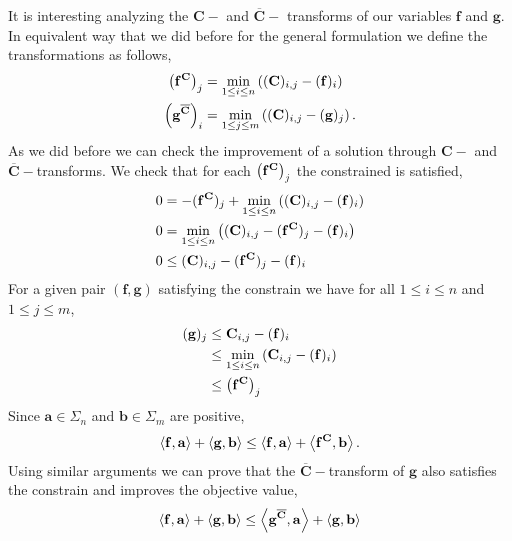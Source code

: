 It is interesting analyzing the $\mathbf{C}-$ and $\overline{\mathbf{C}}-$ transforms of our variables $\mathbf{f}$ and $\mathbf{g}$. In equivalent way that we did before for the general formulation we define the transformations as follows,
\begin{align}
	\left( \mathbf{f}^{\mathbf{C}} \right)_{j}&=\min_{1\leq i\leq n}\left( (\mathbf{C})_{i,j}-(\mathbf{f})_i \right)\\
	\left( \mathbf{g}^{\overline{\mathbf{C}}} \right)_{i}&=\min_{1\leq j\leq m}\left( (\mathbf{C})_{i,j}-(\mathbf{g})_j \right).
\end{align}
As we did before we can check the improvement of a solution through $\mathbf{C}-$ and $\overline{\mathbf{C}}-$transforms. We check that for each $\left( \mathbf{f}^{\mathbf{C}} \right)_{j}$ the constrained is satisfied,
\begin{align*}
	0&=-(\mathbf{f^{\mathbf{C}}})_j+\min_{1\leq i\leq n}\left( (\mathbf{C})_{i,j}-(\mathbf{f})_i \right)\\
	0&=\min_{1\leq i\leq n}\left( (\mathbf{C})_{i,j}-(\mathbf{f^{\mathbf{C}}})_j-(\mathbf{f})_i \right)\\
	0&\leq (\mathbf{C})_{i,j}-(\mathbf{f^{\mathbf{C}}})_j-(\mathbf{f})_i
\end{align*} 
For a given pair $(\mathbf{f,g})$ satisfying the constrain we have for all $1\leq i\leq n$ and $1\leq j\leq m$,
\begin{align*}
	(\mathbf{g})_j&\leq \mathbf{C}_{i,j}-(\mathbf{f})_i\\
	&\leq \min_{1\leq i\leq n}\left( \mathbf{C}_{i,j}-(\mathbf{f})_i \right) \\&\leq \left( \mathbf{f^\mathbf{C}} \right)_j
\end{align*} 
Since $\mathbf{a}\in \Sigma_n$ and $\mathbf{b}\in \Sigma_m$ are positive,
\begin{equation}
	\left\langle \mathbf{f},\mathbf{a} \right\rangle+\left\langle \mathbf{g},\mathbf{b} \right\rangle\leq \left\langle \mathbf{f},\mathbf{a} \right\rangle+\left\langle \mathbf{f^C},\mathbf{b} \right\rangle.
\end{equation}
Using similar arguments we can prove that the $\overline{\mathbf{C}}-$transform of $\mathbf{g}$ also satisfies the constrain and improves the objective value,
\begin{align}
	\left\langle \mathbf{f},\mathbf{a} \right\rangle+\left\langle \mathbf{g},\mathbf{b} \right\rangle\leq \left\langle \mathbf{g^{\overline{C}}},\mathbf{a} \right\rangle+\left\langle \mathbf{g},\mathbf{b} \right\rangle
\end{align}


